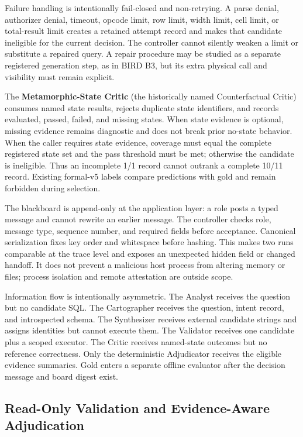 \documentclass[applsci,article,submit,moreauthors]{Definitions/mdpi}
\begin{document}
Failure handling is intentionally fail-closed and non-retrying. A parse denial, authorizer denial, timeout, opcode limit, row limit, width limit, cell limit, or total-result limit creates a retained attempt record and makes that candidate ineligible for the current decision. The controller cannot silently weaken a limit or substitute a repaired query. A repair procedure may be studied as a separate registered generation step, as in BIRD B3, but its extra physical call and visibility must remain explicit.

The \textbf{Metamorphic-State Critic} (the historically named Counterfactual Critic) consumes named state results, rejects duplicate state identifiers, and records evaluated, passed, failed, and missing states. When state evidence is optional, missing evidence remains diagnostic and does not break prior no-state behavior. When the caller requires state evidence, coverage must equal the complete registered state set and the pass threshold must be met; otherwise the candidate is ineligible. Thus an incomplete 1/1 record cannot outrank a complete 10/11 record. Existing formal-v5 labels compare predictions with gold and remain forbidden during selection.

The blackboard is append-only at the application layer: a role posts a typed message and cannot rewrite an earlier message. The controller checks role, message type, sequence number, and required fields before acceptance. Canonical serialization fixes key order and whitespace before hashing. This makes two runs comparable at the trace level and exposes an unexpected hidden field or changed handoff. It does not prevent a malicious host process from altering memory or files; process isolation and remote attestation are outside scope.

Information flow is intentionally asymmetric. The Analyst receives the question but no candidate SQL. The Cartographer receives the question, intent record, and introspected schema. The Synthesizer receives external candidate strings and assigns identities but cannot execute them. The Validator receives one candidate plus a scoped executor. The Critic receives named-state outcomes but no reference correctness. Only the deterministic Adjudicator receives the eligible evidence summaries. Gold enters a separate offline evaluator after the decision message and board digest exist.

\subsection{Read-Only Validation and Evidence-Aware Adjudication}
\end{document}
